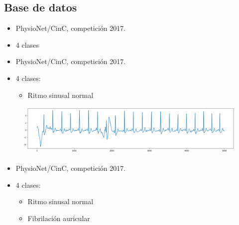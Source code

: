 \subsection{Base de datos}

\begin{frame}
\begin{overprint}
        \begin{itemize}
            \item PhysioNet/CinC, competición 2017.
            \item 4 clases
        \end{itemize}
        
        \begin{itemize}
            \item PhysioNet/CinC, competición 2017.
            \item 4 clases: 
                \begin{itemize}
                    \item Ritmo sinusal normal
                \end{itemize}
        \end{itemize}
        
        \begin{figure}
            \centering
            \includegraphics[keepaspectratio=true,height=0.25\paperheight]{Images/Normal.png}
        \end{figure}
    
        \begin{itemize}
            \item PhysioNet/CinC, competición 2017.
            \item 4 clases: 
                \begin{itemize}
                    \item Ritmo sinusal normal
                    \item Fibrilación auricular
                \end{itemize}
        \end{itemize}
        

\end{overprint}
\end{frame}
